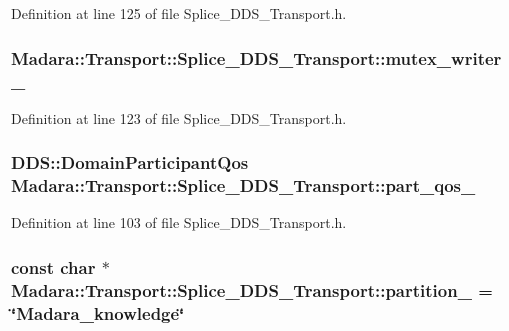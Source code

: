 Definition at line 125 of file Splice\_\-DDS\_\-Transport.h.

\hypertarget{classMadara_1_1Transport_1_1Splice__DDS__Transport_a25d6d97d2481e8e6029218a44dec010c}{
\subsubsection[{mutex\_\-writer\_\-}]{ {\bf Madara::Transport::Splice\_\-DDS\_\-Transport::mutex\_\-writer\_\-}}}
\label{d0/d91/classMadara_1_1Transport_1_1Splice__DDS__Transport_a25d6d97d2481e8e6029218a44dec010c}


Definition at line 123 of file Splice\_\-DDS\_\-Transport.h.

\hypertarget{classMadara_1_1Transport_1_1Splice__DDS__Transport_ad77310b0ee1cebb506c4cbf01e273085}{
\subsubsection[{part\_\-qos\_\-}]{\setlength{\rightskip}{0pt plus 5cm}DDS::DomainParticipantQos {\bf Madara::Transport::Splice\_\-DDS\_\-Transport::part\_\-qos\_\-}}}
\label{d0/d91/classMadara_1_1Transport_1_1Splice__DDS__Transport_ad77310b0ee1cebb506c4cbf01e273085}


Definition at line 103 of file Splice\_\-DDS\_\-Transport.h.

\hypertarget{classMadara_1_1Transport_1_1Splice__DDS__Transport_a0c6b219ff8ce5f4495c3416e582f94e2}{
\subsubsection[{partition\_\-}]{\setlength{\rightskip}{0pt plus 5cm}const char $\ast$ {\bf Madara::Transport::Splice\_\-DDS\_\-Transport::partition\_\-} = \char`\"{}Madara\_\-knowledge\char`\"{}}}
\label{d0/d91/classMadara_1_1Transport_1_1Splice__DDS__Transport_a0c6b219ff8ce5f4495c3416e582f94e2}


